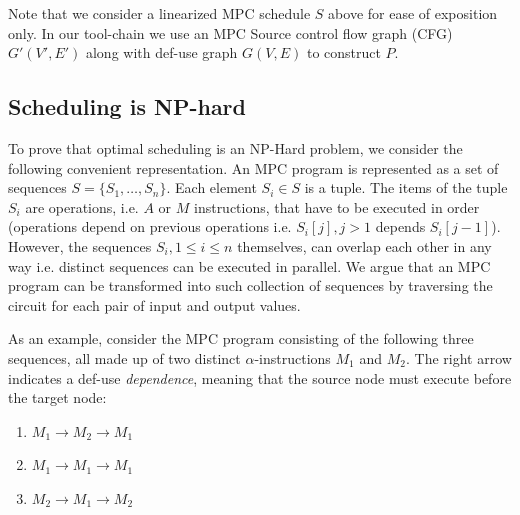 
Note that we consider a linearized MPC schedule $S$ above for ease of exposition only. In our tool-chain we use an MPC Source control flow graph (CFG) $G'(V', E')$ along with def-use graph $G(V,E)$ to construct $P$. %

\subsection{Scheduling is NP-hard}
\label{sec:np}

To prove that optimal scheduling is an NP-Hard problem, we consider the following convenient representation. An MPC program is represented as a set of sequences $S = \{S_1, \dots, S_n\}$. Each element $S_i \in S$ is a tuple. The items of the tuple $S_i$ are operations, i.e. $A$ or $M$ instructions, that have to be executed in order (operations depend on previous operations i.e. $S_i[j], j > 1$ depends $S_i[j-1]$). However, the sequences $S_i, 1 \leq i \leq n$ themselves, can overlap each other in any way i.e. distinct sequences can be executed in parallel. We argue that an MPC program can be transformed into such collection of sequences by traversing the circuit for each pair of input and output values. 

As an example, consider the MPC program consisting of the following three sequences, all made up of two distinct $\alpha$-instructions $M_1$ and $M_2$. The right arrow indicates a def-use \emph{dependence}, meaning that the source node must execute before the target node: 

\begin{enumerate}
    \item $M_1 \rightarrow M_2 \rightarrow M_1$
    \item $M_1 \rightarrow M_1 \rightarrow M_1$
    \item $M_2 \rightarrow M_1 \rightarrow M_2$
\end{enumerate} 


